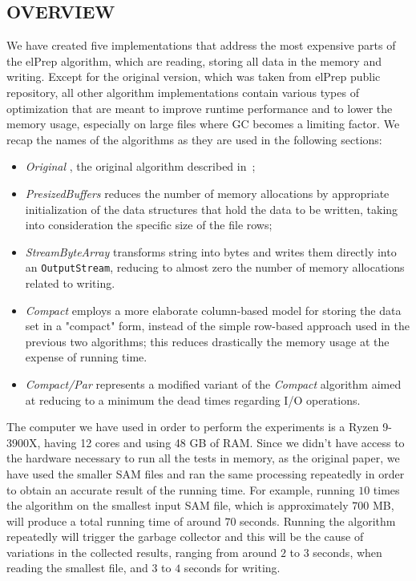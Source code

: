 \documentclass[a4paper,twoside]{article}
\begin{document}
{\subsection{\uppercase{Overview}}
\label{subsec:overview}

We have created five implementations that address the most expensive parts of the elPrep algorithm, which are reading,  storing all data in the memory and writing.
Except for the original version, which was taken from elPrep public repository, all other algorithm implementations contain various types of optimization that are meant to improve runtime performance and to lower the memory usage, especially on large files where GC becomes a limiting factor. 
We recap the names of the algorithms as they are used in the following sections:
\begin{itemize}
\item {\textit{Original} }, the original algorithm described in~\cite{costanza:2019};

\item {\textit{PresizedBuffers} } reduces the number of memory allocations by appropriate initialization of the data structures that hold the data to be written, taking into consideration the specific size of the file rows;

\item {\textit{StreamByteArray} } transforms string into bytes and writes them directly into an \texttt{OutputStream}, reducing to almost zero the number of memory allocations related to writing.

\item {\textit{Compact} } employs a more elaborate column-based model for storing the data set in a "compact" form, instead of the simple row-based approach used in the previous two algorithms; this reduces drastically the memory usage at the expense of running time.

\item {\textit{Compact/Par} } represents a modified variant of the {\textit{Compact} } algorithm aimed at reducing to a minimum the dead times regarding I/O operations.

\end{itemize}


The computer we have used in order to perform the experiments is a Ryzen 9-3900X, having 12 cores and using 48 GB of RAM\@.
Since we didn't have access to the hardware necessary to run all the tests in memory, as the original paper, we have used the smaller SAM files and ran the same processing repeatedly in order to obtain an accurate result of the running time.
For example, running $10$ times the algorithm on the smallest input SAM file, which is approximately $700$ MB, will produce a total running time of around $70$ seconds. 
Running the algorithm repeatedly will trigger the garbage collector and this will be the cause of variations in the collected results, ranging from around $2$ to $3$ seconds, when reading the smallest file, and $3$ to $4$ seconds for writing.

}
\end{document}
